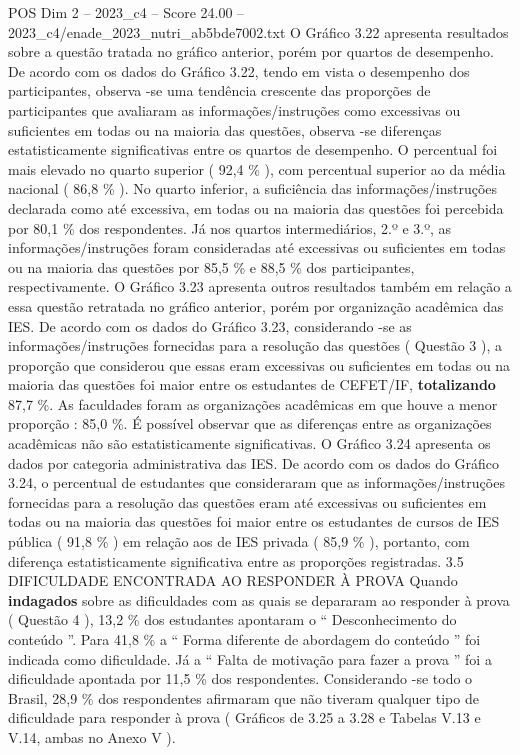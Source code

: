 \begin{textsample}{POS Dim 2 – 2023\_c4 – Score 24.00 – 2023\_c4/enade\_2023\_nutri\_ab5bde7002.txt}
O Gráfico 3.22 apresenta resultados sobre a questão tratada no gráfico anterior, porém por quartos de desempenho.
De acordo com os dados do Gráfico 3.22, tendo em vista o desempenho dos participantes, observa -se uma tendência crescente das proporções de participantes que avaliaram as informações/instruções como excessivas ou suficientes em todas ou na maioria das questões, observa -se diferenças estatisticamente significativas entre os quartos de desempenho.
O percentual foi mais elevado no quarto superior ( 92,4 \% ), com percentual superior ao da média nacional ( 86,8 \% ).
No quarto inferior, a suficiência das informações/instruções declarada como até excessiva, em todas ou na maioria das questões foi percebida por 80,1 \% dos respondentes.
Já nos quartos intermediários, 2.º e 3.º, as informações/instruções foram consideradas até excessivas ou suficientes em todas ou na maioria das questões por 85,5 \% e 88,5 \% dos participantes, respectivamente.
O Gráfico 3.23 apresenta outros resultados também em relação a essa questão retratada no gráfico anterior, porém por organização acadêmica das IES.
De acordo com os dados do Gráfico 3.23, considerando -se as informações/instruções fornecidas para a resolução das questões ( Questão 3 ), a proporção que considerou que essas eram excessivas ou suficientes em todas ou na maioria das questões foi maior entre os estudantes de CEFET/IF, \textbf{totalizando} 87,7 \%.
As faculdades foram as organizações acadêmicas em que houve a menor proporção : 85,0 \%.
É possível observar que as diferenças entre as organizações acadêmicas não são estatisticamente significativas.
O Gráfico 3.24 apresenta os dados por categoria administrativa das IES.
De acordo com os dados do Gráfico 3.24, o percentual de estudantes que consideraram que as informações/instruções fornecidas para a resolução das questões eram até excessivas ou suficientes em todas ou na maioria das questões foi maior entre os estudantes de cursos de IES pública ( 91,8 \% ) em relação aos de IES privada ( 85,9 \% ), portanto, com diferença estatisticamente significativa entre as proporções registradas. 3.5 DIFICULDADE ENCONTRADA AO RESPONDER À PROVA Quando \textbf{indagados} sobre as dificuldades com as quais se depararam ao responder à prova ( Questão 4 ), 13,2 \% dos estudantes apontaram o “ Desconhecimento do conteúdo ”.
Para 41,8 \% a “ Forma diferente de abordagem do conteúdo ” foi indicada como dificuldade.
Já a “ Falta de motivação para fazer a prova ” foi a dificuldade apontada por 11,5 \% dos respondentes.
Considerando -se todo o Brasil, 28,9 \% dos respondentes afirmaram que não tiveram qualquer tipo de dificuldade para responder à prova ( Gráficos de 3.25 a 3.28 e Tabelas V.13 e V.14, ambas no Anexo V ).

\end{textsample}
